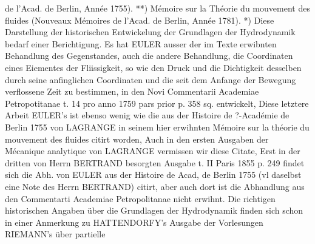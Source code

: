 \documentclass[11pt]{article}
\begin{document}
de l’Acad. de Berlin, Année 1755). **) Mémoire sur la Théorie du mouvement des fluides (Nouveaux Mémoires de l’Acad. de Berlin, Année 1781). *) Diese Darstellung der
historischen Entwickelung der Grundlagen der Hydrodynamik bedarf einer Berichtigung.
Es hat EULER ausser der im Texte erwibnten Behandlung des Gegenstandes, auch die
andere Behandlung, die Coordinaten eines Eiementes der Fliissigkeit, so wie den Druck
und die Dichtigkeit desselben durch seine anfinglichen Coordinaten und die seit dem Anfange der Bewegung verflossene Zeit zu bestimmen, in den Novi Commentarii Academiae
Petropotitanae t. 14 pro anno 1759 pars prior p. 358 sq. entwickelt, Diese letztere Arbeit
EULER’s ist ebenso wenig wie die aus der Histoire de ?-Académie de Berlin 1755 von
LAGRANGE in seinem hier erwihnten Mémoire sur la théorie du mouvement des fluides
citirt worden, Auch in den ersten Ausgaben der Mécanique analytique von LAGRANGE
vermissen wir diese Citate, Erst in der dritten von Herrn BERTRAND besorgten Ausgabe t. II Paris 1855 p. 249 findet sich die Abh. von EULER aus der Histoire de Acad, de
Berlin 1755 (vl daselbst eine Note des Herrn BERTRAND) citirt, aber auch dort ist die
Abhandlung aus den Commentarti Academiae Petropolitanae nicht erwihnt. Die richtigen
historischen Angaben über die Grundlagen der Hydrodynamik finden sich schon in einer
Anmerkung zu HATTENDORFY’s Ausgabe der Vorlesungen RIEMANN’s über partielle
\end{document}
